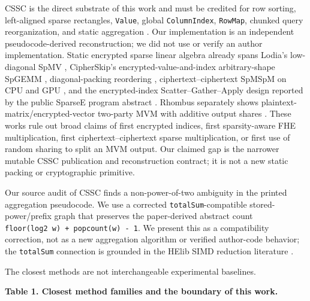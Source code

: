 CSSC is the direct substrate of this work and must be credited for row sorting, left-aligned sparse rectangles, \texttt{Value}, global \texttt{ColumnIndex}, \texttt{RowMap}, chunked query reorganization, and static aggregation \cite{gao2026cssc}. Our implementation is an independent pseudocode-derived reconstruction; we did not use or verify an author implementation. Static encrypted sparse linear algebra already spans Lodia's low-diagonal SpMV \cite{yu2025lodia}, CipherSkip's encrypted-value-and-index arbitrary-shape SpGEMM \cite{xiong2026cipherskip}, diagonal-packing reordering \cite{mutluergil2026diagonal}, ciphertext--ciphertext SpMSpM on CPU and GPU \cite{ferguson2025unstructured,dagata2026gpu}, and the encrypted-index Scatter--Gather--Apply design reported by the public SparseE program abstract \cite{wei2026sparsee}. Rhombus separately shows plaintext-matrix/encrypted-vector two-party MVM with additive output shares \cite{he2024rhombus}. These works rule out broad claims of first encrypted indices, first sparsity-aware FHE multiplication, first ciphertext--ciphertext sparse multiplication, or first use of random sharing to split an MVM output. Our claimed gap is the narrower mutable CSSC publication and reconstruction contract; it is not a new static packing or cryptographic primitive.

Our source audit of CSSC \cite{gao2026cssc} finds a non-power-of-two ambiguity in the printed aggregation pseudocode. We use a corrected \texttt{totalSum}-compatible stored-power/prefix graph that preserves the paper-derived abstract count \texttt{floor(log2\ w)\ +\ popcount(w)\ -\ 1}. We present this as a compatibility correction, not as a new aggregation algorithm or verified author-code behavior; the \texttt{totalSum} connection is grounded in the HElib SIMD reduction literature \cite{halevi2014algorithms}.

The closest methods are not interchangeable experimental baselines.

\textbf{Table 1. Closest method families and the boundary of this work.}

